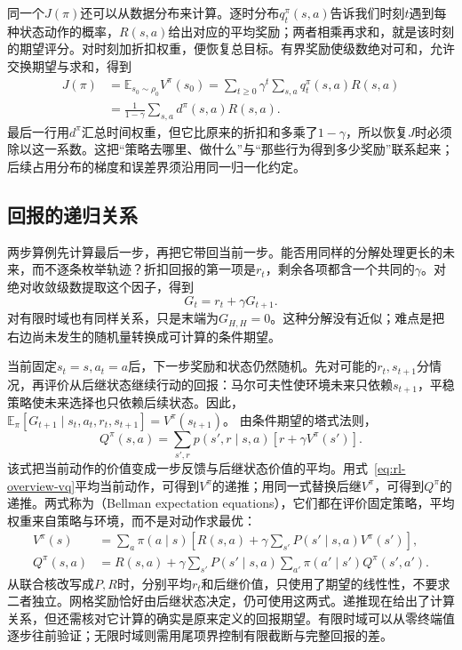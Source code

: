 同一个$J(\pi)$还可以从数据分布来计算。逐时分布$q_t^\pi(s,a)$告诉我们时刻$t$遇到每种状态动作的概率，$R(s,a)$给出对应的平均奖励；两者相乘再求和，就是该时刻的期望评分。对时刻加折扣权重，便恢复总目标。有界奖励使级数绝对可和，允许交换期望与求和，得到
\begin{equation}
\begin{aligned}
  J(\pi)
   &=\mathbb E_{s_0\sim\rho_0}V^\pi(s_0)
     =\sum_{t\geq0}\gamma^t\sum_{s,a}q_t^\pi(s,a)R(s,a)\\
   &=\frac{1}{1-\gamma}\sum_{s,a}d^\pi(s,a)R(s,a).
\end{aligned}
\label{eq:rl-overview-objective-occupancy}
\end{equation}
最后一行用$d^\pi$汇总时间权重，但它比原来的折扣和多乘了$1-\gamma$，所以恢复$J$时必须除以这一系数。这把“策略去哪里、做什么”与“那些行为得到多少奖励”联系起来；后续占用分布的梯度和误差界须沿用同一归一化约定。

\subsection{回报的递归关系}
\label{sec:rl-overview-bellman}

两步算例先计算最后一步，再把它带回当前一步。能否用同样的分解处理更长的未来，而不逐条枚举轨迹？折扣回报的第一项是$r_t$，剩余各项都含一个共同的$\gamma$。对绝对收敛级数提取这个因子，得到
\begin{equation}
  G_t=r_t+\gamma G_{t+1}.
  \label{eq:rl-overview-return-recursion}
\end{equation}
对有限时域也有同样关系，只是末端为$G_{H,H}=0$。这种分解没有近似；难点是把右边尚未发生的随机量转换成可计算的条件期望。

当前固定$s_t=s,a_t=a$后，下一步奖励和状态仍然随机。先对可能的$r_t,s_{t+1}$分情况，再评价从后继状态继续行动的回报：马尔可夫性使环境未来只依赖$s_{t+1}$，平稳策略使未来选择也只依赖后续状态。因此，
$\mathbb E_\pi[G_{t+1}\mid s_t,a_t,r_t,s_{t+1}]=V^\pi(s_{t+1})$。
由条件期望的塔式法则，
\begin{equation}
  Q^\pi(s,a)=\sum_{s',r}p(s',r\mid s,a)
                         [r+\gamma V^\pi(s')].
  \label{eq:rl-overview-bellman-qv}
\end{equation}
该式把当前动作的价值变成一步反馈与后继状态价值的平均。用式~\eqref{eq:rl-overview-vq}平均当前动作，可得到$V^\pi$的递推；用同一式替换后继$V^\pi$，可得到$Q^\pi$的递推。两式称为（Bellman expectation equations），它们都在评价固定策略，平均权重来自策略与环境，而不是对动作求最优：
\begin{align}
 V^\pi(s)
  &=\sum_a\pi(a\mid s)
        \left[R(s,a)+\gamma\sum_{s'}P(s'\mid s,a)V^\pi(s')\right],
        \label{eq:rl-overview-bellman-v}\\
 Q^\pi(s,a)
  &=R(s,a)+\gamma\sum_{s'}P(s'\mid s,a)
          \sum_{a'}\pi(a'\mid s')Q^\pi(s',a').
        \label{eq:rl-overview-bellman-q}
\end{align}
从联合核改写成$P,R$时，分别平均$r_t$和后继价值，只使用了期望的线性性，不要求二者独立。网格奖励恰好由后继状态决定，仍可使用这两式。递推现在给出了计算关系，但还需核对它计算的确实是原来定义的回报期望。有限时域可以从零终端值逐步往前验证；无限时域则需用尾项界控制有限截断与完整回报的差。

